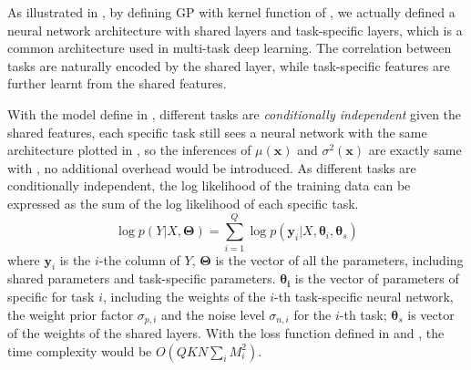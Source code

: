 As illustrated in , by defining GP with kernel function of , we actually defined a neural network architecture with shared layers and task-specific layers, which is a common architecture used in multi-task deep learning\cite{ruder2017overview}. The correlation between tasks are naturally encoded by the shared layer, while task-specific features are further learnt from the shared features. 

With the model define in , different tasks are \emph{conditionally independent} given the shared features, each specific task still sees a neural network with the same architecture plotted in , so the inferences of $\mu(\bm{x})$ and $\sigma^2(\bm{x})$ are exactly same with , no additional overhead would be introduced. As different tasks are conditionally independent, the log likelihood of the training data can be expressed as the sum of the log likelihood of each specific task.
\begin{equation}
    \label{eq:mo_likelihood}
    \log p(Y | X, \bm{\Theta}) = \sum_{i=1}^Q \log p(\bm{y}_i | X, \bm{\theta}_i, \bm{\theta}_s)
\end{equation}
where $\bm{y}_i$ is the $i$-the column of $Y$, $\bm{\Theta}$ is the vector of all the parameters, including shared parameters and task-specific parameters. $\bm{\theta_i}$ is the vector of parameters of specific for task $i$, including the weights of the $i$-th task-specific neural network, the weight prior factor $\sigma_{p, i}$ and the noise level $\sigma_{n, i}$ for the $i$-th task; $\bm{\theta}_s$ is vector of the weights of the shared layers. With the loss function defined in  and , the time complexity would be $O(QKN\sum_i M_i^2)$.
